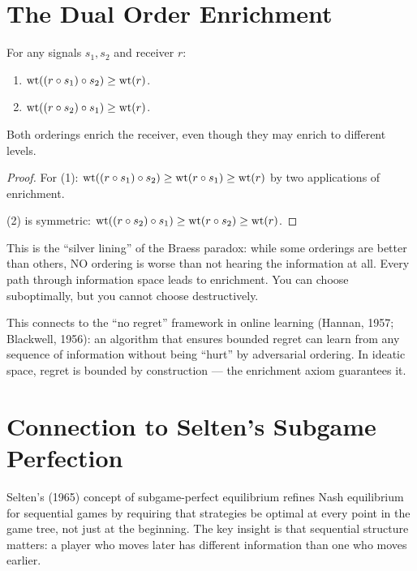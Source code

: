 \section{The Dual Order Enrichment}

\begin{theorem}
\label{thm:dual-enrichment}
For any signals $s_1, s_2$ and receiver $r$:
\begin{enumerate}
\item $\operatorname{wt}((r \circ s_1) \circ s_2) \geq \operatorname{wt}(r)$.
\item $\operatorname{wt}((r \circ s_2) \circ s_1) \geq \operatorname{wt}(r)$.
\end{enumerate}
Both orderings enrich the receiver, even though they may enrich to different levels.
\end{theorem}

\begin{proof}
For (1): $\operatorname{wt}((r \circ s_1) \circ s_2) \geq \operatorname{wt}(r \circ s_1) \geq \operatorname{wt}(r)$ by two applications of enrichment.

(2) is symmetric: $\operatorname{wt}((r \circ s_2) \circ s_1) \geq \operatorname{wt}(r \circ s_2) \geq \operatorname{wt}(r)$.
\end{proof}

\begin{interpretation}
This is the ``silver lining'' of the Braess paradox: while some orderings are better than others, NO ordering is worse than not hearing the information at all. Every path through information space leads to enrichment. You can choose suboptimally, but you cannot choose destructively.

This connects to the ``no regret'' framework in online learning (Hannan, 1957; Blackwell, 1956): an algorithm that ensures bounded regret can learn from any sequence of information without being ``hurt'' by adversarial ordering. In ideatic space, regret is bounded by construction --- the enrichment axiom guarantees it.
\end{interpretation}

\section{Connection to Selten's Subgame Perfection}

Selten's (1965) concept of subgame-perfect equilibrium refines Nash equilibrium for sequential games by requiring that strategies be optimal at every point in the game tree, not just at the beginning. The key insight is that sequential structure matters: a player who moves later has different information than one who moves earlier.

